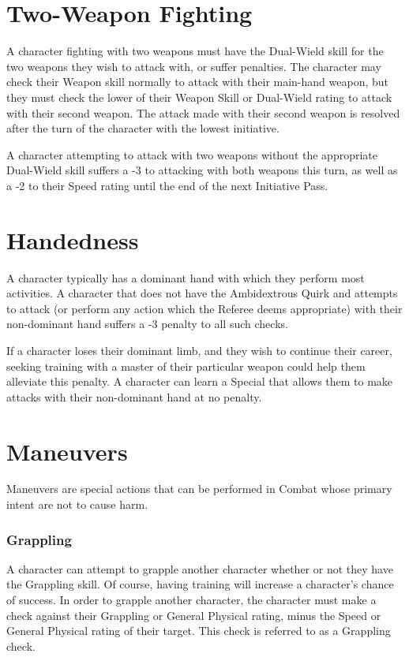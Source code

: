 \documentclass[oneside]{book}
\begin{document}
\begin{multicols}{2}
\section{Two-Weapon Fighting}
A character fighting with two weapons must have the Dual-Wield skill for the two weapons they wish to attack with, or suffer penalties. The character may check their Weapon skill normally to attack with their main-hand weapon, but they must check the lower of their Weapon Skill or Dual-Wield rating to attack with their second weapon. The attack made with their second weapon is resolved after the turn of the character with the lowest initiative. 

A character attempting to attack with two weapons without the appropriate Dual-Wield skill suffers a -3 to attacking with both weapons this turn, as well as a -2 to their Speed rating until the end of the next Initiative Pass. 

\section{Handedness}
A character typically has a dominant hand with which they perform most activities. A character that does not have the Ambidextrous Quirk and attempts to attack (or perform any action which the Referee deems appropriate) with their non-dominant hand suffers a -3 penalty to all such checks.

If a character loses their dominant limb, and they wish to continue their career, seeking training with a master of their particular weapon could help them alleviate this penalty. A character can learn a Special that allows them to make attacks with their non-dominant hand at no penalty.

\section{Maneuvers}
Maneuvers are special actions that can be performed in Combat whose primary intent are not to cause harm. 

\subsubsection{Grappling}
A character can attempt to grapple another character whether or not they have the Grappling skill. Of course, having training will increase a character's chance of success. In order to grapple another character, the character must make a check against their Grappling or General Physical rating, minus the Speed or General Physical rating of their target. This check is referred to as a Grappling check. 


\end{multicols}
\end{document}

